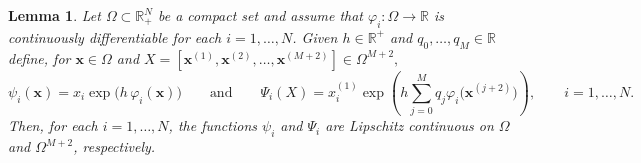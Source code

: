 \documentclass[a4paper,num-refs]{oup-contemporary-spidec}
\newtheorem{lemma}[theorem]{Lemma}
\begin{document}
\begin{lemma}
\label{lem:component-wise_lipschitz}
Let $\Omega \subset \mathbb{R}_{+}^{N}$ be a compact set and assume that $\varphi_i :\Omega\to \mathbb{R}$ is continuously differentiable for each $i=1,\dots,N$. Given $h\in \mathbb{R}^+$ and $q_0,\dots,q_M \in \mathbb{R}$ define, for $\bm{x}\in\Omega$ and $X = [\bm{x}^{(1)},\bm{x}^{(2)},\dots,\bm{x}^{(M+2)}] \in \Omega^{M+2},$
\begin{equation}\label{eq:Psi_lem}
    \psi_i(\bm{x}) = x_i \exp\!\big(h\,\varphi_i(\bm{x})\big) \qquad \text{and} \qquad \Psi_i(X) = x^{(1)}_i \exp\!\left(h\sum_{j=0}^M q_j \varphi_i\big(\bm{x}^{(j+2)}\big)\right), \qquad i=1,\dots,N.
\end{equation}
Then, for each $i=1,\dots,N$, the functions $\psi_i$ and $\Psi_i$ are Lipschitz continuous on $\Omega$ and $\Omega^{M+2}$, respectively.
\end{lemma}
\end{document}
